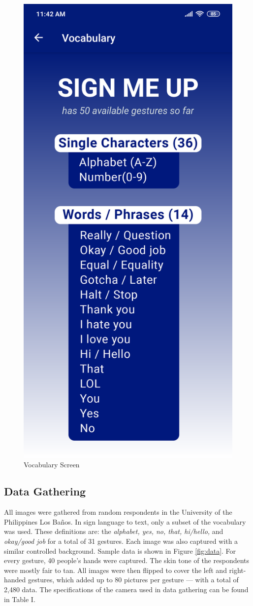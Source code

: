 \documentclass[journal]{./IEEE/IEEEtran}
\begin{document}
\begin{figure}[ht!]
    \centering
    \includegraphics[width=0.58\linewidth]{./images/screen_vocabulary.png}
    \caption{Vocabulary Screen}
    \label{fig:vocabulary}
\end{figure}

\subsection{Data Gathering}
All images were gathered from random respondents in the University of the Philippines Los Ba\~{n}os. In sign language to text, only a subset of the vocabulary was used. These definitions are: the \textit{alphabet, yes, no, that, hi/hello,} and \textit{okay/good job} for a total of 31 gestures. Each image was also captured with a similar controlled background. Sample data is shown in Figure \ref{fig:data}.
\newline
\indent For every gesture, 40 people's hands were captured. The skin tone of the respondents were mostly fair to tan. All images were then flipped to cover the left and right-handed gestures, which added up to 80 pictures per gesture --- with a total of 2,480 data.
\newline
\indent The specifications of the camera used in data gathering can be found in Table I.
\end{document}

